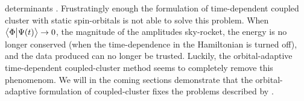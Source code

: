             determinants \cite{pedersen2018symplectic}.
            Frustratingly enough the formulation of time-dependent coupled
            cluster with static spin-orbitals is not able to solve this problem.
            When $\braket{\Phi}{\Psi(t)} \to 0$, the magnitude of the amplitudes
            sky-rocket, the energy is no longer conserved (when the
            time-dependence in the Hamiltonian is turned off), and the data
            produced can no longer be trusted.
            Luckily, the orbital-adaptive time-dependent coupled-cluster method
            seems to completely remove this phenomenom.
            We will in the coming sections demonstrate that the orbital-adaptive
            formulation of coupled-cluster fixes the problems described by
            \citeauthor{pedersen2018symplectic} \cite{pedersen2018symplectic}.

